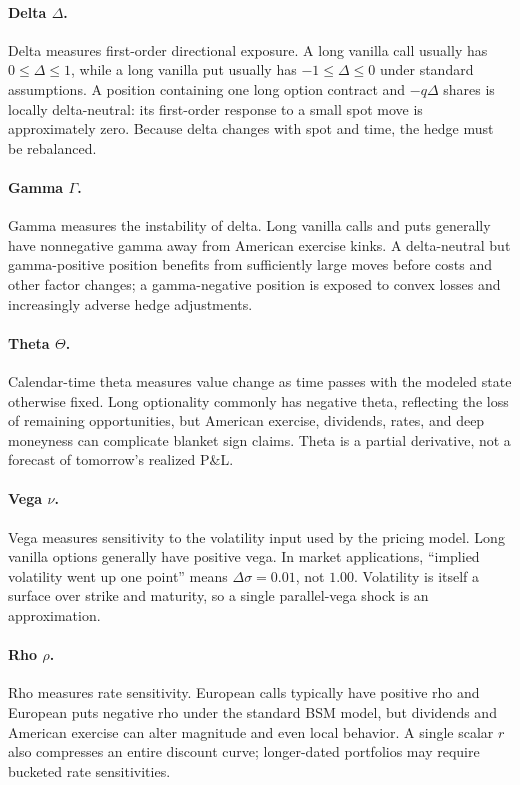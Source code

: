 \documentclass[11pt]{article}
\begin{document}
\paragraph{Delta $\Delta$.} Delta measures first-order directional exposure. A long vanilla call usually has $0\leq\Delta\leq 1$, while a long vanilla put usually has $-1\leq\Delta\leq 0$ under standard assumptions. A position containing one long option contract and $-q\Delta$ shares is locally delta-neutral: its first-order response to a small spot move is approximately zero. Because delta changes with spot and time, the hedge must be rebalanced.

\paragraph{Gamma $\Gamma$.} Gamma measures the instability of delta. Long vanilla calls and puts generally have nonnegative gamma away from American exercise kinks. A delta-neutral but gamma-positive position benefits from sufficiently large moves before costs and other factor changes; a gamma-negative position is exposed to convex losses and increasingly adverse hedge adjustments.

\paragraph{Theta $\Theta$.} Calendar-time theta measures value change as time passes with the modeled state otherwise fixed. Long optionality commonly has negative theta, reflecting the loss of remaining opportunities, but American exercise, dividends, rates, and deep moneyness can complicate blanket sign claims. Theta is a partial derivative, not a forecast of tomorrow's realized P\&L.

\paragraph{Vega $\nu$.} Vega measures sensitivity to the volatility input used by the pricing model. Long vanilla options generally have positive vega. In market applications, ``implied volatility went up one point'' means $\Delta\sigma=0.01$, not $1.00$. Volatility is itself a surface over strike and maturity, so a single parallel-vega shock is an approximation.

\paragraph{Rho $\rho$.} Rho measures rate sensitivity. European calls typically have positive rho and European puts negative rho under the standard BSM model, but dividends and American exercise can alter magnitude and even local behavior. A single scalar $r$ also compresses an entire discount curve; longer-dated portfolios may require bucketed rate sensitivities.
\end{document}
